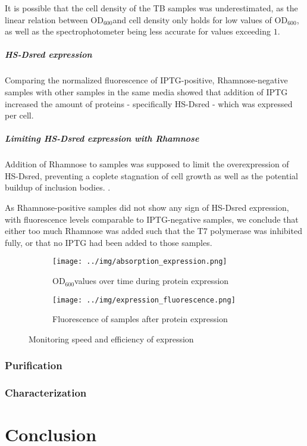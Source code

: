 \documentclass[a4paper,overfullrule=true]{scrartcl}
\newcommand{\odbact}{$\text{OD}_{600}$}
\begin{document}
It is possible that the cell density of the TB samples was underestimated, as
the linear relation between \odbact and cell density only holds for low values
of \odbact, as well as the spectrophotometer being less accurate for values
exceeding $1$.

\subsubsection{HS-Dsred expression}

Comparing the normalized fluorescence of IPTG-positive, Rhamnose-negative
samples with other samples in the same media showed that addition of IPTG
increased the amount of proteins - specifically HS-Dsred - which was expressed
per cell.

\subsubsection{Limiting HS-Dsred expression with Rhamnose}

Addition of Rhamnose to samples was supposed to limit the overexpression of
HS-Dsred, preventing a coplete stagnation of cell growth as well as the
potential buildup of inclusion bodies. \cite{memstar}.

As Rhamnose-positive samples did not show any sign of HS-Dsred expression, with
fluorescence levels comparable to IPTG-negative samples, we conclude that
either too much Rhamnose was added such that the T7 polymerase was inhibited
fully, or that no IPTG had been added to those samples.


\begin{figure}
	\centering
	\begin{subfigure}{\textwidth}
		\texttt{[image: ../img/absorption\_expression.png]}
		\caption{\odbact values over time during protein expression}
		\label{fig:absorption_expression}
	\end{subfigure}

	\begin{subfigure}{\textwidth}
		\centering
		\texttt{[image: ../img/expression\_fluorescence.png]}
		\caption{Fluorescence of samples after protein expression}
		\label{fig:fluorescence_expression}
	\end{subfigure}

	\caption{Monitoring speed and efficiency of expression}
	\label{fig:expression}
\end{figure}


\section{Purification}



\section{Characterization}


\newpage
\part*{Conclusion}



\newpage


\end{document}

